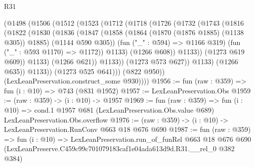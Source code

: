 \begin{lexlean}{R31}
\begin{coremodule}
                  (@1498
                    (@1506
                      (@1512
                        (@1523
                          (@1712
                            (@1718
                              (@1726
                                (@1732
                                  (@1743
                                    (@1816
                                      (@1822
                                        (@1830
                                          (@1836
                                            (@1847
                                              (@1858
                                                (@1864 (@1870 (@1876 @1885) (@1138 @305)) @1885)
                                                (@1144 @590 @305))
                                              (fun ("_" : @594) => @1166 @319)
                                              (fun ("_" : @593 @1170) => @1172))
                                            @1133)
                                          (@1266 @608))
                                        @1133))
                                    (@1273 @619 @609))
                                  @1133)
                                (@1266 @621))
                              @1133))
                          (@1273 @573 @627))
                        @1133)
                      (@1266 @635))
                    @1133))
                (@1273 @525 @641)))
            (@822 @950))
          (LexLeanPreservation.construct_some @930))))
@1956 := fun (raw : @359) => fun (i : @10) => @743 (@831 @1952)
@1957 := LexLeanPreservation.Obs
@1959 := (raw : @359) -> (i : @10) -> @1957
@1969 := fun (raw : @359) =>
  fun (i : @10) =>
  cond.{1} @1957 @681 (LexLeanPreservation.Obs.value @689) LexLeanPreservation.Obs.overflow
@1976 := (raw : @359) -> (i : @10) -> LexLeanPreservation.RunConv @663 @18 @676 @690
@1987 := fun (raw : @359) =>
  fun (i : @10) =>
  LexLeanPreservation.run_of_funRel
    @663
    @18
    @676
    @690
    (LexLeanPreserve.C459c99c701079183caf1e04ada613d9d.R31.__rel_0 @382 @384)
\end{coremodule}
\end{lexlean}
